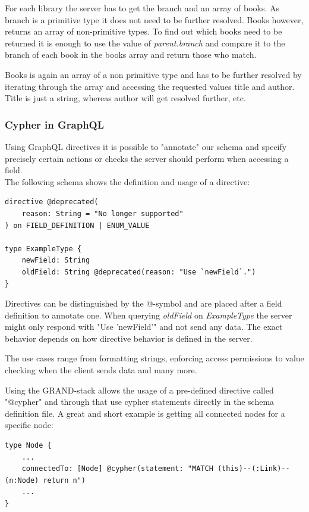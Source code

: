 For each library the server has to get the branch and an array of books. As branch is a primitive type it does not need to be further resolved. Books however, returns an array of non-primitive types. To find out which books need to be returned it is enough to use the value of \emph{parent.branch} and compare it to the branch of each book in the books array and return those who match.

Books is again an array of a non primitive type and has to be further resolved by iterating through the array and accessing the requested values title and author. Title is just a string, whereas author will get resolved further, etc.

\subsubsection{Cypher in GraphQL}
Using GraphQL directives it is possible to "annotate" our schema and specify precisely certain actions or checks the server should perform when accessing a field. \\
The following schema shows the definition and usage of a directive: \cite{GraphQlDir}

\lstset{language=GraphQL}
\begin{lstlisting}[caption={Example Directive Declaration}]
directive @deprecated( 
	reason: String = "No longer supported" 
) on FIELD_DEFINITION | ENUM_VALUE 

type ExampleType { 
	newField: String 
	oldField: String @deprecated(reason: "Use `newField`.")
}
\end{lstlisting}

Directives can be distinguished by the @-symbol and are placed after a field definition to annotate one. When querying \emph{oldField} on \emph{ExampleType} the server might only respond with "Use 'newField'" and not send any data. The exact behavior depends on how directive behavior is defined in the server.

The use cases range from formatting strings, enforcing access permissions to value checking when the client sends data and many more. 

Using the GRAND-stack allows the usage of a pre-defined directive called "@cypher" and through that use cypher statements directly in the schema definition file. A great and short example is getting all connected nodes for a specific node:

\begin{lstlisting}[caption={Cypher in GraphQL}]
type Node { 
	... 
	connectedTo: [Node] @cypher(statement: "MATCH (this)--(:Link)--(n:Node) return n") 
	...
}
\end{lstlisting}

